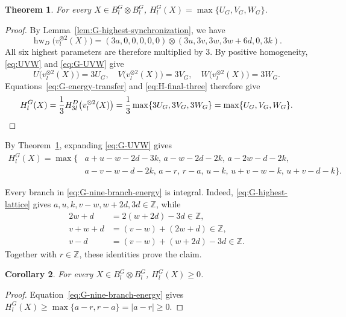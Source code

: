 \documentclass[11pt,reqno]{amsart}
\newcommand{\hw}{\operatorname{hw}}
\numberwithin{table}{section}
\numberwithin{equation}{section}
\theoremstyle{plain}
\newtheorem{theorem}{Theorem}[section]
\newtheorem{corollary}[theorem]{Corollary}
\theoremstyle{definition}
\begin{document}
\begin{theorem}
	\label{thm:G-closed-energy}
	For every \(X\in B_l^G\otimes B_l^G\), $H_l^G(X)=\max\{U_G,V_G,W_G\}$.
\end{theorem}

\begin{proof}
	By Lemma~\ref{lem:G-highest-synchronization}, we have
	\[
	\hw_D\bigl(v_l^{\otimes2}(X)\bigr)
	=
	(3a,0,0,0,0,0)
	\otimes
	(3u,3v,3w,3w+6d,0,3k).
	\]
	All six highest parameters are therefore multiplied by \(3\).
	By positive homogeneity, \eqref{eq:UVW} and \eqref{eq:G-UVW} give
	\[
	U\bigl(v_l^{\otimes2}(X)\bigr)=3U_G,\quad
	V\bigl(v_l^{\otimes2}(X)\bigr)=3V_G,\quad
	W\bigl(v_l^{\otimes2}(X)\bigr)=3W_G.
	\]
	Equations~\eqref{eq:G-energy-transfer} and
	\eqref{eq:H-final-three} therefore give
	\[
		H_l^G(X)
		=
		\frac13
		H_{3l}^D\bigl(v_l^{\otimes2}(X)\bigr)
		=
		\frac13\max\{3U_G,3V_G,3W_G\}
		=
		\max\{U_G,V_G,W_G\}.\qedhere
	\]
\end{proof}

By Theorem~\ref{thm:G-closed-energy}, expanding
\eqref{eq:G-UVW} gives
\begin{equation}\label{eq:G-nine-branch-energy}
	\begin{aligned}
		H_l^G(X)=\max\bigl\{&
		a+u-w-2d-3k,\,
		a-w-2d-2k,\,
		a-2w-d-2k,\\
		&
		a-v-w-d-2k,\,
		a-r,\,
		r-a,\,
		u-k,\,
		u+v-w-k,\,
		u+v-d-k
		\bigr\}.
	\end{aligned}
\end{equation}

Every branch in \eqref{eq:G-nine-branch-energy} is integral.
Indeed, \eqref{eq:G-highest-lattice} gives
\(a,u,k,v-w,w+2d,3d\in\mathbb Z\), while
\[
\begin{aligned}
	2w+d
	&=2(w+2d)-3d\in\mathbb Z,\\
	v+w+d
	&=(v-w)+(2w+d)\in\mathbb Z,\\
	v-d
	&=(v-w)+(w+2d)-3d\in\mathbb Z.
\end{aligned}
\]
Together with \(r\in\mathbb Z\), these identities prove the claim.

\begin{corollary}
	For every \(X\in B_l^G\otimes B_l^G\),
	\(H_l^G(X)\ge0\).
\end{corollary}

\begin{proof}
	Equation~\eqref{eq:G-nine-branch-energy} gives
	\(H_l^G(X)\ge\max\{a-r,r-a\}=|a-r|\ge0\).
\end{proof}
\end{document}
